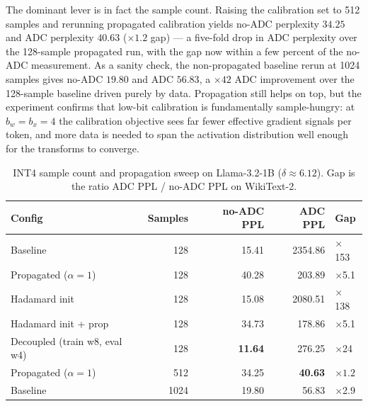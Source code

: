 \documentclass[a4paper,11pt,oneside]{article}
\theoremstyle{breakstyle}
\begin{document}
  The dominant lever is in fact the sample count.  Raising the
  calibration set to 512 samples and rerunning propagated calibration
  yields no-ADC perplexity $34.25$ and ADC perplexity
  $\mathbf{40.63}$ ($\mathbf{\times 1.2}$ gap) --- a five-fold drop
  in ADC perplexity over the 128-sample propagated run, with the gap
  now within a few percent of the no-ADC measurement.  As a sanity
  check, the non-propagated baseline rerun at 1024 samples gives
  no-ADC $19.80$ and ADC $56.83$, a $\times 42$ ADC improvement over
  the 128-sample baseline driven purely by data.  Propagation still
  helps on top, but the experiment confirms that low-bit calibration
  is fundamentally sample-hungry: at $b_w = b_x = 4$ the calibration
  objective sees far fewer effective gradient signals per token,
  and more data is needed to span the activation distribution well
  enough for the transforms to converge.

  \begin{table}[htbp]
    \centering
    \caption{INT4 sample count and propagation sweep on Llama-3.2-1B
      ($\delta \approx 6.12$). Gap is the ratio
      ADC PPL / no-ADC PPL on WikiText-2.}
    \label{tab:int4v1}
    \renewcommand{\arraystretch}{1.15}
    \begin{tabular}{@{}lrrrl@{}}
      \toprule
      \textbf{Config} & \textbf{Samples} & \textbf{no-ADC PPL} & \textbf{ADC PPL} & \textbf{Gap} \\
      \midrule
      Baseline                       & 128  & 15.41 & 2354.86 & $\times$153 \\
      Propagated ($\alpha=1$)        & 128  & 40.28 & 203.89  & $\times$5.1 \\
      Hadamard init                  & 128  & 15.08 & 2080.51 & $\times$138 \\
      Hadamard init + prop           & 128  & 34.73 & 178.86  & $\times$5.1 \\
      Decoupled (train w8, eval w4)  & 128  & \textbf{11.64} & 276.25 & $\times$24 \\
      Propagated ($\alpha=1$)        & 512  & 34.25 & \textbf{40.63} & $\mathbf{\times 1.2}$ \\
      Baseline                       & 1024 & 19.80 & 56.83   & $\times$2.9 \\
      \bottomrule
    \end{tabular}
  \end{table}

\end{document}
